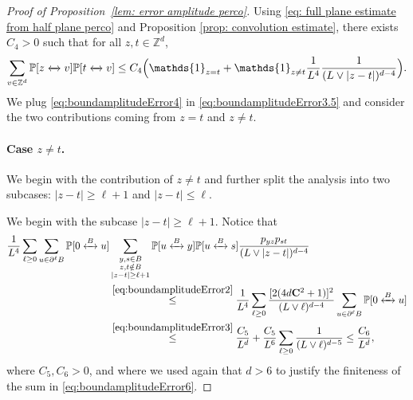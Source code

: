 \documentclass[11pt,a4paper]{article}
\numberwithin{equation}{section}
\theoremstyle{plain}
\theoremstyle{definition}
\newcommand\bfC{\mathbf{C}}
\newcommand{\connect}{\xleftrightarrow}
\begin{document}
\begin{proof}[Proof of Proposition~\textup{\ref{lem: error amplitude perco}}]
Using \eqref{eq: full plane estimate from half plane perco} and Proposition \ref{prop: convolution estimate}, there exists $C_4>0$ such that for all $z,t\in \mathbb Z^d$,
 \begin{equation}\label{eq:boundamplitudeError4}
 	\sum_{v\in \mathbb Z^d}\mathbb P[z\connect{}v]\mathbb P[t\connect{}v]\leq C_4\Big(\mathds{1}_{z=t}+\mathds{1}_{z\ne t}\frac{1}{L^4}\frac{1}{(L\vee|z-t|)^{d-4}}\Big).
 \end{equation}
 We plug \eqref{eq:boundamplitudeError4} in \eqref{eq:boundamplitudeError3.5} and consider the two contributions coming from $z=t$ and $z\neq t$.
 
\paragraph{Case $z\ne t$.} We begin with the contribution of $z\neq t$ and further split the analysis into two subcases: $|z-t|\geq \ell+1$ and $|z-t|\leq \ell$. 

We begin with the subcase $|z-t|\geq \ell+1$. Notice that
 \begin{align}
	\frac{1}{L^4}\sum_{\ell\geq 0}\sum_{u\in \partial^\ell B}\mathbb P[0 \connect{B\:}u]&\sum_{\substack{y,s\in B\\ z,t\notin B\\ |z-t|\geq \ell+1}}\mathbb P[u \connect{B\:}y]\mathbb P[u\connect{B\:}s]\frac{p_{yz}p_{st}}{(L\vee|z-t|)^{d-4}}\notag
	\\&\stackrel{\eqref{eq:boundamplitudeError2}}\leq \frac{1}{L^4}\sum_{\ell\geq 0}\frac{[2(4d\bfC^2+1)]^2}{(L\vee\ell)^{d-4}}\sum_{u\in \partial^\ell B}\mathbb P[0\connect{B\:}u]\notag
	\\&\stackrel{\eqref{eq:boundamplitudeError3}}\leq \frac{C_5}{L^d}+\frac{C_5}{L^6}\sum_{\ell\geq 0}\frac{1}{(L\vee \ell)^{d-5}}\leq \frac{C_6}{L^d},\label{eq:boundamplitudeError6}
\end{align}
where $C_5,C_6>0$, and where we used again that $d>6$ to justify the finiteness of the sum in  \eqref{eq:boundamplitudeError6}. 


\end{proof}
\end{document}
